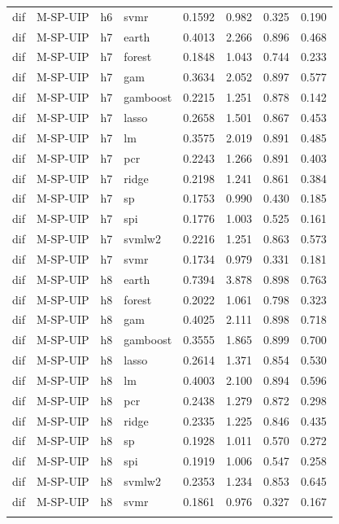 \begin{ThreePartTable}
\begin{longtable}[t]{llclcccc}
dif & M-SP-UIP & h6 & svmr & 0.1592 & 0.982 & 0.325 & 0.190\\
\addlinespace
dif & M-SP-UIP & h7 & earth & 0.4013 & 2.266 & 0.896 & 0.468\\
dif & M-SP-UIP & h7 & forest & 0.1848 & 1.043 & 0.744 & 0.233\\
dif & M-SP-UIP & h7 & gam & 0.3634 & 2.052 & 0.897 & 0.577\\
dif & M-SP-UIP & h7 & gamboost & 0.2215 & 1.251 & 0.878 & 0.142\\
dif & M-SP-UIP & h7 & lasso & 0.2658 & 1.501 & 0.867 & 0.453\\
dif & M-SP-UIP & h7 & lm & 0.3575 & 2.019 & 0.891 & 0.485\\
dif & M-SP-UIP & h7 & pcr & 0.2243 & 1.266 & 0.891 & 0.403\\
dif & M-SP-UIP & h7 & ridge & 0.2198 & 1.241 & 0.861 & 0.384\\
dif & M-SP-UIP & h7 & sp & 0.1753 & 0.990 & 0.430 & 0.185\\
dif & M-SP-UIP & h7 & spi & 0.1776 & 1.003 & 0.525 & 0.161\\
dif & M-SP-UIP & h7 & svmlw2 & 0.2216 & 1.251 & 0.863 & 0.573\\
dif & M-SP-UIP & h7 & svmr & 0.1734 & 0.979 & 0.331 & 0.181\\
\addlinespace
dif & M-SP-UIP & h8 & earth & 0.7394 & 3.878 & 0.898 & 0.763\\
dif & M-SP-UIP & h8 & forest & 0.2022 & 1.061 & 0.798 & 0.323\\
dif & M-SP-UIP & h8 & gam & 0.4025 & 2.111 & 0.898 & 0.718\\
dif & M-SP-UIP & h8 & gamboost & 0.3555 & 1.865 & 0.899 & 0.700\\
dif & M-SP-UIP & h8 & lasso & 0.2614 & 1.371 & 0.854 & 0.530\\
dif & M-SP-UIP & h8 & lm & 0.4003 & 2.100 & 0.894 & 0.596\\
dif & M-SP-UIP & h8 & pcr & 0.2438 & 1.279 & 0.872 & 0.298\\
dif & M-SP-UIP & h8 & ridge & 0.2335 & 1.225 & 0.846 & 0.435\\
dif & M-SP-UIP & h8 & sp & 0.1928 & 1.011 & 0.570 & 0.272\\
dif & M-SP-UIP & h8 & spi & 0.1919 & 1.006 & 0.547 & 0.258\\
dif & M-SP-UIP & h8 & svmlw2 & 0.2353 & 1.234 & 0.853 & 0.645\\
dif & M-SP-UIP & h8 & svmr & 0.1861 & 0.976 & 0.327 & 0.167\\
\addlinespace

\end{longtable}
\end{ThreePartTable}
